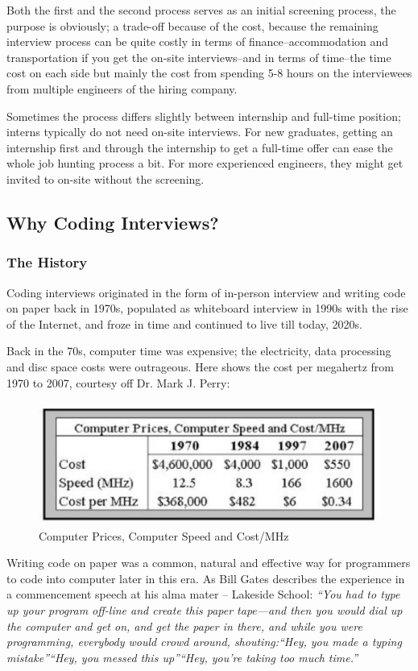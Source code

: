 \documentclass[../main.tex]{subfiles}
\begin{document}
Both the first and the second process serves as an initial screening process, the purpose is obviously; a trade-off because of the cost, because the remaining interview process can be quite costly in terms of finance--accommodation and transportation if you get  the on-site interviews--and in terms of time--the time cost on each side but mainly the cost from spending 5-8 hours on the interviewees from multiple engineers of the hiring company. 

Sometimes the process differs slightly between internship and full-time position; interns typically do not need on-site interviews. For new graduates, getting an internship first and through the internship to get a full-time offer can ease the whole job hunting process a bit. For more experienced engineers, they might get invited to on-site without the screening. 

\subsection{Why Coding Interviews?}
\subsubsection{The History} Coding interviews originated in the form of in-person interview and writing code on paper back in 1970s, populated as whiteboard interview in 1990s with the rise of the Internet, and froze in time and continued to live till today, 2020s.

Back in the 70s, computer time was expensive; the electricity, data processing and disc space costs were outrageous. Here shows the cost per megahertz from 1970 to 2007, courtesy off  Dr. Mark J. Perry:
\begin{figure}[h]
    \centering
    \includegraphics[width=0.8\columnwidth]{fig/mhz_640.jpg}
    \caption{Computer Prices, Computer Speed and Cost/MHz}
    \label{fig:interview_cost}
\end{figure}

Writing code on paper was a common, natural and effective way for programmers to code into computer later in this era. As Bill Gates describes the experience in a commencement speech at his alma mater -- Lakeside School: \textit{``You had to type up your program off-line and create this paper tape—and then you would dial up the computer and get on, and get the paper in there, and while you were programming, everybody would crowd around, shouting:``Hey, you made a typing mistake''``Hey, you messed this up''``Hey, you’re taking too much time.''}
\end{document}

